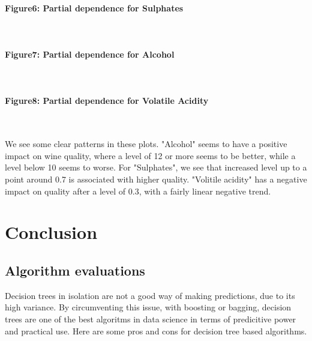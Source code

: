 \documentclass[10pt, a4paper, twocolumn]{article}
\newcommand{\myparagraph}[1]{\paragraph{#1}\mbox{}\\}
\begin{document}
			\myparagraph{Figure6: Partial dependence for Sulphates}
			\myparagraph{Figure7: Partial dependence for Alcohol}
			\myparagraph{Figure8: Partial dependence for Volatile Acidity}
			
			We see some clear patterns in these plots. "Alcohol" seems to have a positive impact on wine quality, where a level of 12 or more seems to be better, while a level below 10 seems to worse. For "Sulphates", we see that increased level up to a point around 0.7 is associated with higher quality. "Volitile acidity" has a negative impact on quality after a level of 0.3, with a fairly linear negative trend.
			
\section{Conclusion}
	\subsection{Algorithm evaluations}
	Decision trees in isolation are not a good way of making predictions, due to its high variance. By circumventing this issue, with boosting or bagging, decision trees are one of the best algoritms in data science in terms of predicitive power and practical use. Here are some pros and cons for decision tree based algorithms.
	
\end{document}
